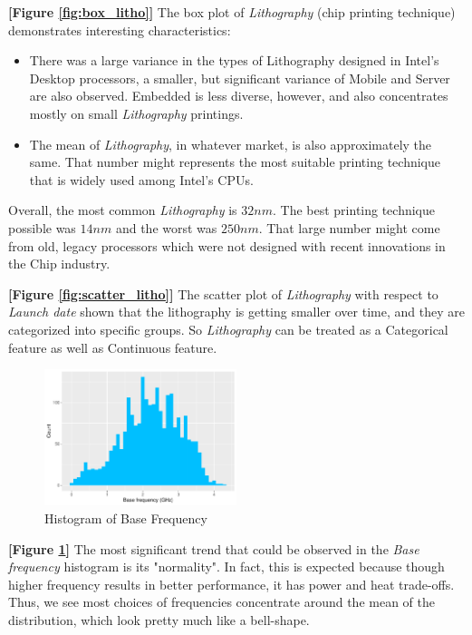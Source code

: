 \textbf{[Figure \ref{fig:box_litho}]} The box plot of \textit{Lithography} (chip printing technique) demonstrates interesting characteristics:
\begin{itemize}
    \item There was a large variance in the types of Lithography designed in Intel's Desktop processors, a smaller, but significant variance of 
    Mobile and Server are also observed. Embedded is less diverse, however, and also concentrates mostly on small \textit{Lithography} printings.

    \item The mean of \textit{Lithography}, in whatever market, is also approximately the same. That number might represents the most suitable 
    printing technique that is widely used among Intel's CPUs.
\end{itemize}

Overall, the most common \textit{Lithography} is $32 nm$. The best printing technique possible was $14 nm$ and the worst was $250 nm$. That large
number might come from old, legacy processors which were not designed with recent innovations in the Chip industry.

\textbf{[Figure \ref{fig:scatter_litho}]} The scatter plot of \textit{Lithography} with respect to \textit{Launch date} shown that the lithography
is getting smaller over time, and they are categorized into specific groups. So \textit{Lithography} can be treated as a Categorical feature as well
as Continuous feature.

\begin{figure}[H]
    \centering
    \includegraphics[width=0.5\textwidth]{./graphics/hist_bfreq.pdf}
    \caption{Histogram of Base Frequency}
    \label{fig:hist_bfreq}
\end{figure}

\textbf{[Figure \ref{fig:hist_bfreq}]} The most significant trend that could be observed in the \textit{Base frequency} histogram is its "normality".
In fact, this is expected because though higher frequency results in better performance, it has power and heat trade-offs. Thus, we see most choices of
frequencies concentrate around the mean of the distribution, which look pretty much like a bell-shape.

